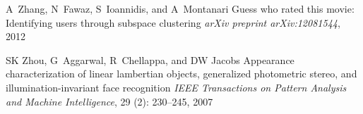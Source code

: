 \documentclass[12pt,heading]{ctexbook}
\begin{document}
\begin{thebibliography}{99}
    A~Zhang, N~Fawaz, S~Ioannidis, and A~Montanari
    \newblock Guess who rated this movie: Identifying users through subspace
    clustering
    \newblock \emph{arXiv preprint arXiv:12081544}, 2012

    SK Zhou, G~Aggarwal, R~Chellappa, and DW Jacobs
    \newblock Appearance characterization of linear lambertian objects, generalized
    photometric stereo, and illumination-invariant face recognition
    \newblock \emph{IEEE Transactions on Pattern Analysis and Machine
    Intelligence}, 29 (2): 230--245, 2007

\end{thebibliography}
\end{document}
